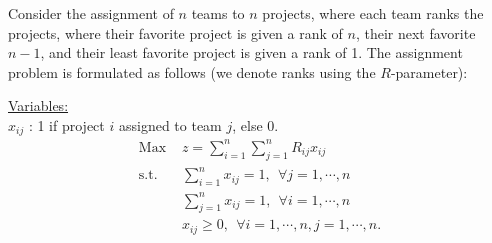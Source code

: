 Consider the assignment of $n$ teams to $n$ projects, where each team ranks the projects, where their favorite project is given a rank of $n$, their next favorite $n-1$, and their least favorite project is given a rank of 1.  The assignment problem is formulated as follows (we denote ranks using the $R$-parameter):

\smallskip \underline{Variables:} \\
$x_{ij}$ : 1 if project $i$ assigned to team $j$, else 0.
\begin{align*}
\mbox{Max~}   & z = \sum_{i=1}^{n}\sum_{j=1}^{n} R_{ij} x_{ij}  \\
\mbox{s.t.~}& \sum_{i=1}^{n} x_{ij} = 1,~~ \forall j = 1,\cdots,n  \\
& \sum_{j=1}^{n} x_{ij} = 1,~~ \forall i = 1,\cdots,n  \\
& x_{ij} \ge 0,~~ \forall i = 1,\cdots,n, j = 1,\cdots,n. 
\end{align*}

